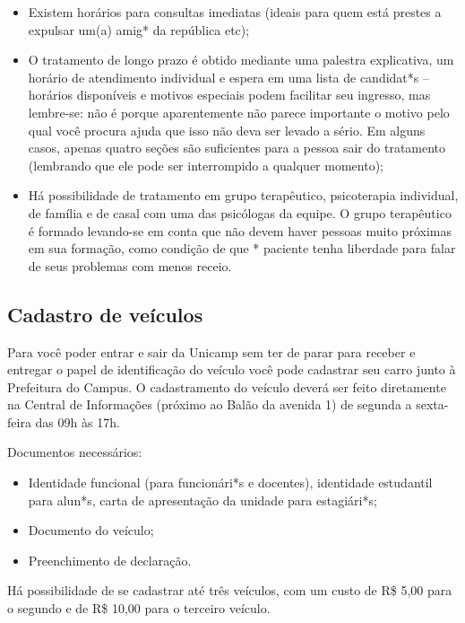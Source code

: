 \begin{itemize}
    \item  Existem horários para consultas imediatas (ideais para quem está
        prestes a expulsar um(a) amig* da república etc);

    \item  O tratamento de longo prazo é obtido mediante uma palestra
        explicativa, um horário de atendimento individual e espera em uma lista
        de candidat*s -- horários disponíveis e motivos especiais podem
        facilitar seu ingresso, mas lembre-se: não é porque aparentemente não
        parece importante o motivo pelo qual você procura ajuda que isso não
        deva ser levado a sério. Em alguns casos, apenas quatro seções são
        suficientes para a pessoa sair do tratamento (lembrando que ele pode ser
        interrompido a qualquer momento);

    \item  Há possibilidade de tratamento em grupo terapêutico, psicoterapia
        individual, de família e de casal com uma das psicólogas da equipe. O
        grupo terapêutico é formado levando-se em conta que não devem haver
        pessoas muito próximas em sua formação, como condição de que * paciente
        tenha liberdade para falar de seus problemas com menos receio.
\end{itemize}

\subsection{Cadastro de veículos}

Para você poder entrar e sair da Unicamp sem ter de parar para receber e
entregar o papel de identificação do veículo você pode cadastrar seu carro junto
à Prefeitura do Campus. O cadastramento do veículo deverá ser feito diretamente
na Central de Informações (próximo ao Balão da avenida 1) de segunda a
sexta-feira das 09h às 17h.

Documentos necessários:

\begin{itemize}
    \item  Identidade funcional (para funcionári*s e docentes), identidade
        estudantil para alun*s, carta de apresentação da unidade para
        estagiári*s;
    \item  Documento do veículo;
    \item  Preenchimento de declaração.
\end{itemize}
Há possibilidade de se cadastrar até três veículos, com um custo de R\$ 5,00
para o segundo e de R\$ 10,00 para o terceiro veículo.

